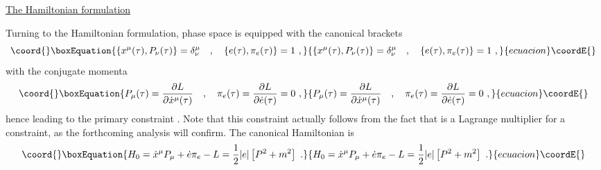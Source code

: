 \documentclass[a4paper,11pt]{article}
\begin{document}
\noindent\underline{The Hamiltonian formulation}

\vspace{5pt}

Turning to the Hamiltonian formulation, phase space is equipped with
the canonical brackets
\begin{equation}\coord{}\boxEquation{
\{x^\mu(\tau),P_\nu(\tau)\}=\delta^\mu_\nu\ \ \ ,\ \ \ 
\{e(\tau),\pi_e(\tau)\}=1\ ,
}{
\{x^\mu(\tau),P_\nu(\tau)\}=\delta^\mu_\nu\ \ \ ,\ \ \ 
\{e(\tau),\pi_e(\tau)\}=1\ ,
}{ecuacion}\coordE{}\end{equation}
with the conjugate momenta
\begin{equation}\coord{}\boxEquation{
P_\mu(\tau)=\frac{\partial L}{\partial\dot{x}^\mu(\tau)}\ \ \ ,\ \ \ 
\pi_e(\tau)=\frac{\partial L}{\partial\dot{e}(\tau)}=0\ ,
}{
P_\mu(\tau)=\frac{\partial L}{\partial\dot{x}^\mu(\tau)}\ \ \ ,\ \ \ 
\pi_e(\tau)=\frac{\partial L}{\partial\dot{e}(\tau)}=0\ ,
}{ecuacion}\coordE{}\end{equation}
hence leading to the primary constraint \coordHE{}. Note that this constraint
actually follows from the fact that \myHighlight{$e(\tau)$}\coordHE{} is a Lagrange multiplier
for a constraint, as the forthcoming analysis will confirm.
The canonical Hamiltonian is
\begin{equation}\coord{}\boxEquation{
H_0=\dot{x}^\mu P_\mu+\dot{e}\pi_e-L=\frac{1}{2}|e|\left[P^2+m^2\right]\ .
}{
H_0=\dot{x}^\mu P_\mu+\dot{e}\pi_e-L=\frac{1}{2}|e|\left[P^2+m^2\right]\ .
}{ecuacion}\coordE{}\end{equation}
\end{document}
